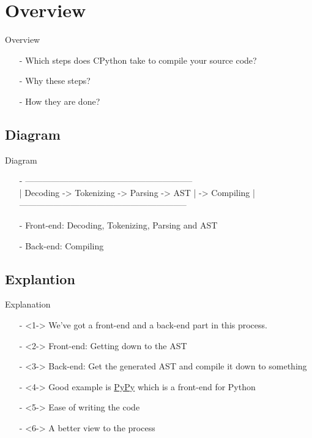 \section{Overview}
\begin{frame}{Overview}
    \begin{itemize}
        \item[-]
        Which steps does CPython take to compile your source code?
        \item[-]
        Why these steps?
        \item[-]
        How they are done?
    \end{itemize}
\end{frame}

\subsection{Diagram}
\begin{frame}{Diagram}
    \begin{itemize}
        \item[-] 
        {\small \ttfamily 
            ----------------------------------------------------------- \\
            | Decoding -> Tokenizing -> Parsing -> AST | -> Compiling | \\
            ----------------------------------------------------------- \\
        }
        
        \item[-]
        Front-end: Decoding, Tokenizing, Parsing and AST
        
        \item[-]
        Back-end: Compiling
    \end{itemize}
\end{frame}

\subsection{Explantion}
\begin{frame}{Explanation}
    \begin{itemize}
        \item[-]<1->
        We’ve got a front-end and a back-end part in this process.
        
        \item[-]<2->
        Front-end: Getting down to the AST
        
        \item[-]<3->
        Back-end: Get the generated AST and compile it down to something
        
        \item[-]<4->
        Good example is \href{https://www.pypy.org/}{PyPy} which is a front-end for Python
        
        \item[-]<5->
        Ease of writing the code
        
        \item[-]<6->
        A better view to the process
    \end{itemize}
\end{frame}
